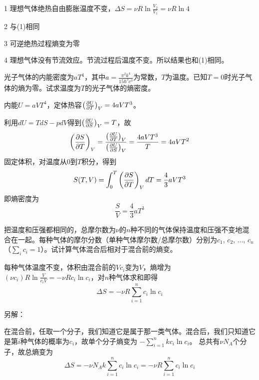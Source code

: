 \documentclass[CJK]{beamer}
\begin{document}
\begin{frame}
  \bch
  \bitem
\item[1]{理想气体绝热自由膨胀温度不变，$\Delta S = \nu R \ln\frac{V_2}{V_1} = \nu R \ln 4$}
\item[2]{与(1)相同}
\item[3]{可逆绝热过程熵变为零}
\item[4]{理想气体没有节流效应。节流过程后温度不变。所以结果也和(1)相同。}
  \eitem
  \ech
\end{frame}

\begin{frame}
\chtitle{\proid (\stwo)}
\bch
光子气体的内能密度为$aT^4$，其中$a=\frac{\pi^2 k^4}{15\hbar^3c^3}$为常数，$T$为温度。已知$T=0$时光子气体的熵为零。试求温度为$T$的光子气体的熵密度。
\ech
\end{frame}

\begin{frame}
  \bch
内能$U=aVT^4$，定体热容$\left(\frac{\partial U}{\partial T}\right)_{V} = 4aVT^3$。

利用$dU = TdS - p dV$得到$\left(\frac{\partial U}{\partial S}\right)_{V} = T$，故
$$\left(\frac{\partial S}{\partial T}\right)_{V} = \frac{\left(\frac{\partial U}{\partial T}\right)_{V}}{\left(\frac{\partial U}{\partial S}\right)_{V}} = \frac{4aVT^3}{T} = 4aVT^2$$
固定体积，对温度从$0$到$T$积分，得到
$$ S(T, V) = \int_0^T \left(\frac{\partial S}{\partial T}\right)_{V} dT = \frac{4}{3}aVT^3 $$
即熵密度为
$$ \frac{S}{V}= \frac{4}{3}aT^3$$
\ech
\end{frame}

\begin{frame}
\chtitle{\proid (\stwo)}
\bch
把温度和压强都相同的，总摩尔数为$\nu$的$n$种不同的气体保持温度和压强不变地混合在一起。每种气体的摩尔分数（单种气体摩尔数/总摩尔数）分别为$c_1$, $c_2$, $\ldots$, $c_n$ （$\sum_i c_i = 1$）。试计算气体混合后相对于混合前的熵变。
\ech
\end{frame}

\begin{frame}
  \bch
{\small
每种气体温度不变，体积由混合前的$Vc_i$变为$V$，熵增为$(\nu c_i) R\ln \frac{V}{c_iV} = - \nu R c_i\ln c_i$，对$n$种气体求和即得
$$\Delta S =   -\nu R \sum_{i=1}^n c_i \ln c_i$$}

\skipline

{\scriptsize
另解：

在混合前，任取一个分子，我们知道它是属于那一类气体。混合后，我们只知道它是第$i$种气体的概率为$c_i$，故单个分子熵变为
$-\sum_{i=1}^{n} kc_i\ln c_i $。 总共有$ \nu N_A $个分子，故总熵变为
$$ \Delta S =  -\nu N_A k\sum_{i=1}^n c_i \ln c_i = -\nu R \sum_{i=1}^n c_i \ln c_i$$  
}
\ech
\end{frame}
\end{document}
